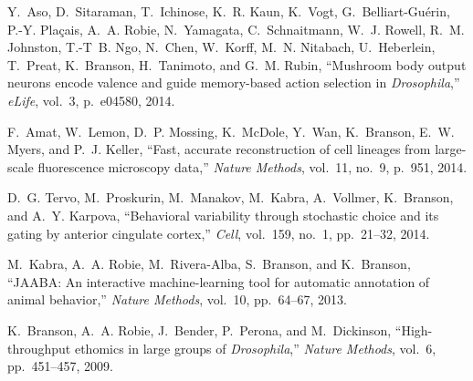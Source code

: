 \begin{cvenum}
\item Y.~Aso, D.~Sitaraman, T.~Ichinose, K.~R. Kaun, K.~Vogt, G.~Belliart-Gu{\'e}rin, P.-Y. Pla{\c{c}}ais, A.~A. Robie, N.~Yamagata, C.~Schnaitmann, W.~J. Rowell, R.~M. Johnston, T.-T~B. Ngo, N.~Chen, W.~Korff, M.~N. Nitabach, U.~Heberlein, T.~Preat, K.~Branson, H.~Tanimoto, and G.~M. Rubin, ``Mushroom body output neurons encode valence and guide memory-based action selection in {\em {{D}}rosophila},'' {\em eLife}, vol.~3, p.~e04580, 2014.

\item F.~Amat, W.~Lemon, D.~P. Mossing, K.~McDole, Y.~Wan, K.~Branson, E.~W. Myers,  and P.~J. Keller, ``Fast, accurate reconstruction of cell lineages from large-scale fluorescence microscopy data,'' {\em Nature Methods}, vol.~11, no.~9, p.~951, 2014.

\item D.~G. Tervo, M.~Proskurin, M.~Manakov, M.~Kabra, A.~Vollmer, K.~Branson, and
  A.~Y. Karpova, ``Behavioral variability through stochastic choice and its
  gating by anterior cingulate cortex,'' {\em Cell}, vol.~159, no.~1,
  pp.~21--32, 2014.
  
\item M.~Kabra, A.~A. Robie, M.~Rivera-Alba, S.~Branson, and K.~Branson, ``{{JAABA}}:  An interactive machine-learning tool for automatic annotation of animal behavior,'' {\em Nature Methods}, vol.~10, pp.~64--67, 2013.
  
\item K.~Branson, A.~A. Robie, J.~Bender, P.~Perona, and M.~Dickinson, ``High-throughput ethomics in large groups of \emph{{D}rosophila},'' {\em Nature Methods}, vol.~6, pp.~451--457, 2009.

\end{cvenum}
